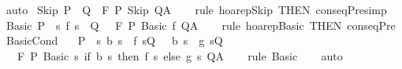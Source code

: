 \begin{isabellebody}
\ auto\isanewline
{}\isamarkupfalse%
%
\endisatagproof
{\isafoldproof}%
%
\isadelimproof
\isanewline
%
\endisadelimproof
\isanewline
{}\isamarkupfalse%
\ Skip{\isacharcolon}\ {\isachardoublequoteopen}P\ {\isasymsubseteq}\ Q\ {\isasymLongrightarrow}\ {\isasymGamma}{\isacharcomma}{\isasymTheta}{\isasymturnstile}\isactrlbsub {\isacharslash}F\isactrlesub \ P\ Skip\ Q{\isacharcomma}A{\isachardoublequoteclose}\isanewline
%
\isadelimproof
\ \ %
\endisadelimproof
%
\isatagproof
{}\isamarkupfalse%
\ {\isacharparenleft}rule\ hoarep{\isachardot}Skip\ {\isacharbrackleft}THEN\ conseqPre{\isacharbrackright}{\isacharcomma}simp{\isacharparenright}%
\endisatagproof
{\isafoldproof}%
%
\isadelimproof
\isanewline
%
\endisadelimproof
\isanewline
{}\isamarkupfalse%
\ Basic{\isacharcolon}\ {\isachardoublequoteopen}P\ {\isasymsubseteq}\ {\isacharbraceleft}s{\isachardot}\ {\isacharparenleft}f\ s{\isacharparenright}\ {\isasymin}\ Q{\isacharbraceright}\ {\isasymLongrightarrow}\ \ {\isasymGamma}{\isacharcomma}{\isasymTheta}{\isasymturnstile}\isactrlbsub {\isacharslash}F\isactrlesub \ P\ {\isacharparenleft}Basic\ f{\isacharparenright}\ Q{\isacharcomma}A{\isachardoublequoteclose}\isanewline
%
\isadelimproof
\ \ %
\endisadelimproof
%
\isatagproof
{}\isamarkupfalse%
\ {\isacharparenleft}rule\ hoarep{\isachardot}Basic\ {\isacharbrackleft}THEN\ conseqPre{\isacharbrackright}{\isacharparenright}%
\endisatagproof
{\isafoldproof}%
%
\isadelimproof
\isanewline
%
\endisadelimproof
\isanewline
{}\isamarkupfalse%
\ BasicCond{\isacharcolon}\ \isanewline
\ \ {\isachardoublequoteopen}{\isasymlbrakk}P\ {\isasymsubseteq}\ {\isacharbraceleft}s{\isachardot}\ {\isacharparenleft}b\ s\ {\isasymlongrightarrow}\ f\ s{\isasymin}Q{\isacharparenright}\ {\isasymand}\ {\isacharparenleft}{\isasymnot}\ b\ s\ {\isasymlongrightarrow}\ g\ s{\isasymin}Q{\isacharparenright}{\isacharbraceright}{\isasymrbrakk}\ {\isasymLongrightarrow}\isanewline
\ \ \ {\isasymGamma}{\isacharcomma}{\isasymTheta}{\isasymturnstile}\isactrlbsub {\isacharslash}F\isactrlesub \ P\ Basic\ {\isacharparenleft}{\isasymlambda}s{\isachardot}\ if\ b\ s\ then\ f\ s\ else\ g\ s{\isacharparenright}\ Q{\isacharcomma}A{\isachardoublequoteclose}\isanewline
%
\isadelimproof
\ \ %
\endisadelimproof
%
\isatagproof
{}\isamarkupfalse%
\ {\isacharparenleft}rule\ Basic{\isacharparenright}\isanewline
\ \ \isamarkupfalse%
\ auto\isanewline
\ \ \isamarkupfalse%
%
\endisatagproof
{\isafoldproof}%
%
\isadelimproof
\isanewline
%
\endisadelimproof

\end{isabellebody}
